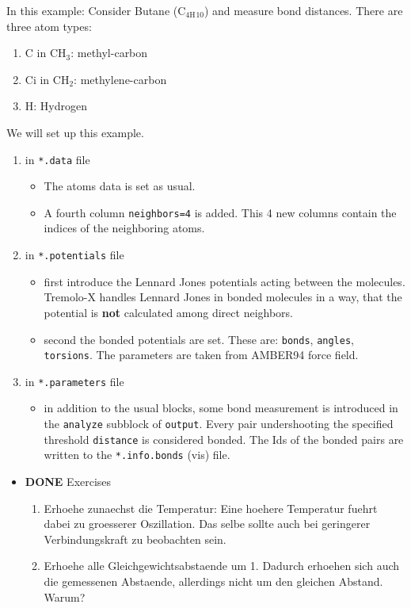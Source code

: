 \documentclass[11pt]{article}
\begin{document}
In this example: Consider Butane (C$_{\mathrm{4H}}$$_{\mathrm{10}}$) and measure bond distances. There are three atom types:
\begin{enumerate}
\item C in CH$_3$: methyl-carbon
\item Ci in CH$_2$: methylene-carbon
\item H: Hydrogen
\end{enumerate}
We will set up this example. 

\begin{enumerate}
\item in \texttt{*.data} file

\begin{itemize}
\item The atoms data is set as usual.
\item A fourth column \texttt{neighbors=4} is added. This 4 new columns contain the indices of the neighboring atoms.
\end{itemize}

\item in \texttt{*.potentials} file

\begin{itemize}
\item first introduce the Lennard Jones potentials acting between the molecules. Tremolo-X handles Lennard Jones in bonded molecules in a way, that the potential is \textbf{not} calculated among direct neighbors.
\item second the bonded potentials are set. These are: \texttt{bonds}, \texttt{angles}, \texttt{torsions}. The parameters are taken from AMBER94 force field.
\end{itemize}

\item in \texttt{*.parameters} file

\begin{itemize}
\item in addition to the usual blocks, some bond measurement is introduced in the \texttt{analyze} subblock of \texttt{output}. Every pair undershooting the specified threshold \texttt{distance} is considered bonded. 
     The Ids of the bonded pairs are written to the \texttt{*.info.bonds} (vis) file.
\end{itemize}

\end{enumerate}
\begin{itemize}

\item \textbf{DONE} Exercises\\
\label{sec-2.4.7.1}

\begin{enumerate}
\item Erhoehe zunaechst die Temperatur: Eine hoehere Temperatur fuehrt dabei zu groesserer Oszillation. Das selbe sollte auch bei geringerer Verbindungskraft zu beobachten sein.
\item Erhoehe alle Gleichgewichtsabstaende um 1. Dadurch erhoehen sich auch die gemessenen Abstaende, allerdings nicht um den gleichen Abstand. Warum?
\end{enumerate}
\end{itemize} %
\end{document}
